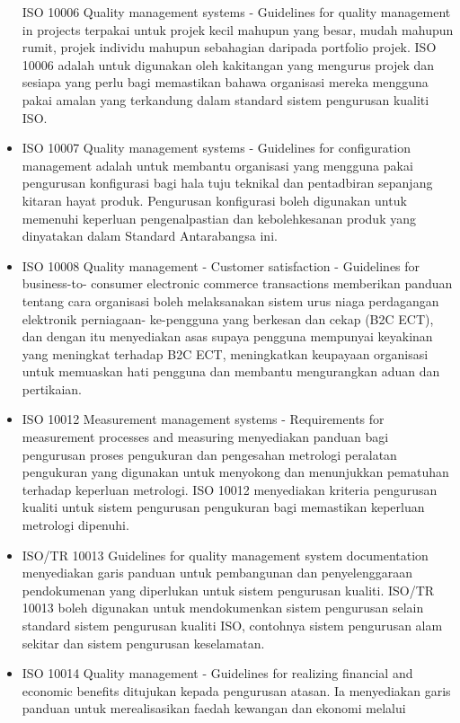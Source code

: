 \documentclass[
]{article}
\begin{document}
\begin{itemize}
  ISO 10006 Quality management systems - Guidelines for quality
  management in projects terpakai untuk projek kecil mahupun yang besar,
  mudah mahupun rumit, projek individu mahupun sebahagian daripada
  portfolio projek. ISO 10006 adalah untuk digunakan oleh kakitangan
  yang mengurus projek dan sesiapa yang perlu bagi memastikan bahawa
  organisasi mereka mengguna pakai amalan yang terkandung dalam standard
  sistem pengurusan kualiti ISO.
\item
  ISO 10007 Quality management systems - Guidelines for configuration
  management adalah untuk membantu organisasi yang mengguna pakai
  pengurusan konfigurasi bagi hala tuju teknikal dan pentadbiran
  sepanjang kitaran hayat produk. Pengurusan konfigurasi boleh digunakan
  untuk memenuhi keperluan pengenalpastian dan kebolehkesanan produk
  yang dinyatakan dalam Standard Antarabangsa ini.
\item
  ISO 10008 Quality management - Customer satisfaction - Guidelines for
  business-to- consumer electronic commerce transactions memberikan
  panduan tentang cara organisasi boleh melaksanakan sistem urus niaga
  perdagangan elektronik perniagaan- ke-pengguna yang berkesan dan cekap
  (B2C ECT), dan dengan itu menyediakan asas supaya pengguna mempunyai
  keyakinan yang meningkat terhadap B2C ECT, meningkatkan keupayaan
  organisasi untuk memuaskan hati pengguna dan membantu mengurangkan
  aduan dan pertikaian.
\item
  ISO 10012 Measurement management systems - Requirements for
  measurement processes and measuring menyediakan panduan bagi
  pengurusan proses pengukuran dan pengesahan metrologi peralatan
  pengukuran yang digunakan untuk menyokong dan menunjukkan pematuhan
  terhadap keperluan metrologi. ISO 10012 menyediakan kriteria
  pengurusan kualiti untuk sistem pengurusan pengukuran bagi memastikan
  keperluan metrologi dipenuhi.
\item
  ISO/TR 10013 Guidelines for quality management system documentation
  menyediakan garis panduan untuk pembangunan dan penyelenggaraan
  pendokumenan yang diperlukan untuk sistem pengurusan kualiti. ISO/TR
  10013 boleh digunakan untuk mendokumenkan sistem pengurusan selain
  standard sistem pengurusan kualiti ISO, contohnya sistem pengurusan
  alam sekitar dan sistem pengurusan keselamatan.
\item
  ISO 10014 Quality management - Guidelines for realizing financial and
  economic benefits ditujukan kepada pengurusan atasan. Ia menyediakan
  garis panduan untuk merealisasikan faedah kewangan dan ekonomi melalui

\end{itemize}
\end{document}
